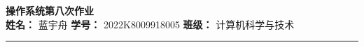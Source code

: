 \newcommand{\Homework}{操作系统第八次作业}
\newcommand{\Name}{蓝宇舟}
\newcommand{\StudentNumber}{2022K8009918005}
\newcommand{\Class}{计算机科学与技术}

\begingroup
    \centering
    \LARGE {\bf \Homework} \\[0.5em]
    \large \textbf{姓名：} \Name \hspace{2em}
           \textbf{学号：} \StudentNumber \hspace{2em}
           \textbf{班级：} \Class \par
\endgroup
\rule{\textwidth}{0.4pt}
\printanswers

